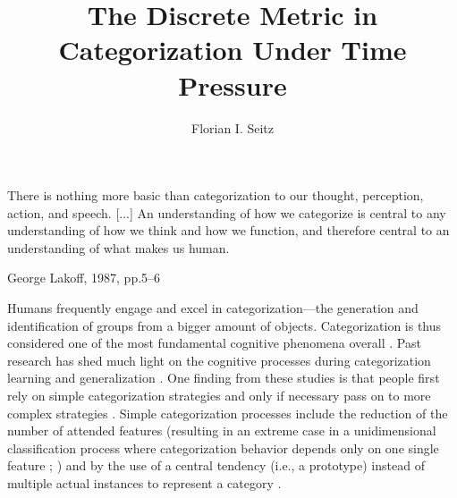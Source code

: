 \documentclass[a4paper,man,natbib]{apa6}
\title{The Discrete Metric in Categorization Under Time Pressure}
\author{Florian I. Seitz}
\affiliation{University of Basel}
\begin{document}
\maketitle

\epigraph{There is nothing more basic than categorization to our thought, perception, action, and speech. [...] An understanding of how we categorize is central to any understanding of how we think and how we function, and therefore central to an understanding of what makes us human.}{George Lakoff, 1987, pp.5--6}

Humans frequently engage and excel in categorization---the generation and identification of groups from a bigger amount of objects. Categorization is thus considered one of the most fundamental cognitive phenomena overall \citep{ashby2001categorization, bruner1956study, cohen2005bridging, lakoff1987women, goldstone2003concepts}. Past research has shed much light on the cognitive processes during categorization learning and generalization \citep[for an overview over the diverse cognitive models of categorization, see][]{kruschke2008models,wills2013models}. One finding from these studies is that people first rely on simple categorization strategies and only if necessary pass on to more complex strategies \citep{gluck2002people, meeter2006strategies, meeter2008probabilistic, johansen2002there, smith1998prototypes}. Simple categorization processes include the reduction of the number of attended features (resulting in an extreme case in a unidimensional classification process where categorization behavior depends only on one single feature ; \citealp{johansen2002there}) and by the use of a central tendency (i.e., a prototype) instead of multiple actual instances to represent a category \citep{smith1998prototypes}. 
\end{document}
